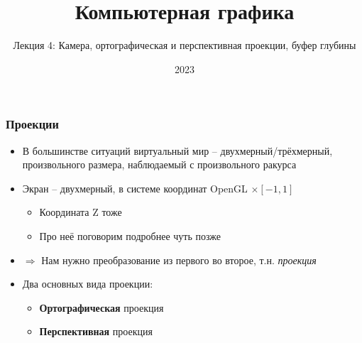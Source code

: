 \documentclass[10pt]{beamer}
\title{Компьютерная графика}
\subtitle{Лекция 4: Камера, ортографическая и перспективная проекции, буфер глубины}
\date{2023}
\begin{document}
\frame{\titlepage}

\begin{frame}[fragile]
\frametitle{Проекции}
\begin{itemize}
\item В большинстве ситуаций виртуальный мир -- двухмерный/трёхмерный, произвольного размера, наблюдаемый с произвольного ракурса
\pause
\item Экран -- двухмерный, в системе координат OpenGL \begin{math}[-1, 1] \times [-1, 1]\end{math}
\pause
\begin{itemize}
\item Координата Z тоже \begin{math}[-1, 1]\end{math}
\item Про неё поговорим подробнее чуть позже
\end{itemize}
\pause
\item \begin{math}\Longrightarrow\end{math} Нам нужно преобразование из первого во второе, т.н. \textit{проекция}
\pause
\item Два основных вида проекции:
\begin{itemize}
\item \textbf{Ортографическая} проекция
\item \textbf{Перспективная} проекция
\end{itemize}
\end{itemize}
\end{frame}
\end{document}
